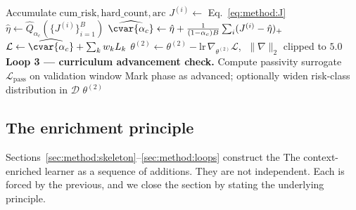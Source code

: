 \begin{algorithm}[t]
\begin{algorithmic}[1]
      \State Accumulate $\mathrm{cum\_risk}, \mathrm{hard\_count}, \mathrm{arc}$
    \EndFor
    \State $J^{(i)} \leftarrow$ Eq.~\eqref{eq:method:J}
    \State $\hat\eta \leftarrow \widehat{Q}_{\alpha_c}(\{J^{(i)}\}_{i=1}^B)$
    \State $\widehat{\cvar{\alpha_c}} \leftarrow
           \hat\eta + \tfrac{1}{(1-\alpha_c)B}\sum_i (J^{(i)} - \hat\eta)_+$
    \State $\mathcal{L} \leftarrow \widehat{\cvar{\alpha_c}}
                + \sum_{k} w_k L_k$
    \State $\theta^{(2)} \leftarrow \theta^{(2)} - \mathrm{lr}\,
            \nabla_{\theta^{(2)}}\mathcal{L}$,
            $\;\|\nabla\|_2$ clipped to $5.0$
  \EndFor
  \Statex \hspace{0.7em}\textbf{Loop 3 — curriculum advancement check.}
  \State Compute passivity surrogate $\mathcal{L}_{\mathrm{pass}}$ on
         validation window
    \State Mark phase as advanced; optionally widen risk-class
           distribution in $\mathcal{D}$
  \EndIf
\EndFor
\State \Return $\theta^{(2)}$
\end{algorithmic}
\end{algorithm}

\subsection{The enrichment principle}
\label{sec:method:enrichment}

Sections~\ref{sec:method:skeleton}–\ref{sec:method:loops} construct the
The context-enriched learner as a sequence of additions. They are not independent.
Each is forced by the previous, and we close the section by stating the
underlying principle.

